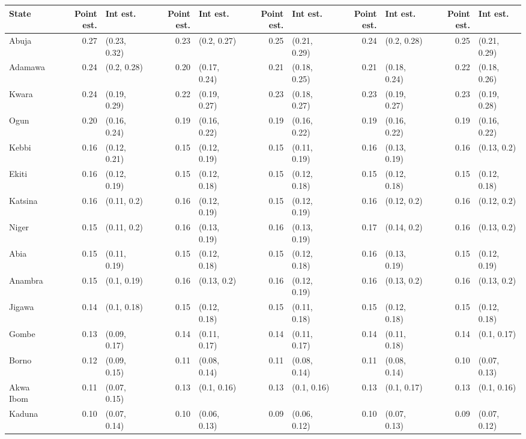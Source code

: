 
\begin{tabular}{lrlrlrlrlrl}
\toprule
State & Point est. & Int est. & Point est. & Int est. & Point est. & Int est. & Point est. & Int est. & Point est. & Int est.\\
\midrule
Abuja & 0.27 & (0.23, 0.32) & 0.23 & (0.2, 0.27) & 0.25 & (0.21, 0.29) & 0.24 & (0.2, 0.28) & 0.25 & (0.21, 0.29)\\
Adamawa & 0.24 & (0.2, 0.28) & 0.20 & (0.17, 0.24) & 0.21 & (0.18, 0.25) & 0.21 & (0.18, 0.24) & 0.22 & (0.18, 0.26)\\
Kwara & 0.24 & (0.19, 0.29) & 0.22 & (0.19, 0.27) & 0.23 & (0.18, 0.27) & 0.23 & (0.19, 0.27) & 0.23 & (0.19, 0.28)\\
Ogun & 0.20 & (0.16, 0.24) & 0.19 & (0.16, 0.22) & 0.19 & (0.16, 0.22) & 0.19 & (0.16, 0.22) & 0.19 & (0.16, 0.22)\\
Kebbi & 0.16 & (0.12, 0.21) & 0.15 & (0.12, 0.19) & 0.15 & (0.11, 0.19) & 0.16 & (0.13, 0.19) & 0.16 & (0.13, 0.2)\\
Ekiti & 0.16 & (0.12, 0.19) & 0.15 & (0.12, 0.18) & 0.15 & (0.12, 0.18) & 0.15 & (0.12, 0.18) & 0.15 & (0.12, 0.18)\\
Katsina & 0.16 & (0.11, 0.2) & 0.16 & (0.12, 0.19) & 0.15 & (0.12, 0.19) & 0.16 & (0.12, 0.2) & 0.16 & (0.12, 0.2)\\
Niger & 0.15 & (0.11, 0.2) & 0.16 & (0.13, 0.19) & 0.16 & (0.13, 0.19) & 0.17 & (0.14, 0.2) & 0.16 & (0.13, 0.2)\\
Abia & 0.15 & (0.11, 0.19) & 0.15 & (0.12, 0.18) & 0.15 & (0.12, 0.18) & 0.16 & (0.13, 0.19) & 0.15 & (0.12, 0.19)\\
Anambra & 0.15 & (0.1, 0.19) & 0.16 & (0.13, 0.2) & 0.16 & (0.12, 0.19) & 0.16 & (0.13, 0.2) & 0.16 & (0.13, 0.2)\\
Jigawa & 0.14 & (0.1, 0.18) & 0.15 & (0.12, 0.18) & 0.15 & (0.11, 0.18) & 0.15 & (0.12, 0.18) & 0.15 & (0.12, 0.18)\\
Gombe & 0.13 & (0.09, 0.17) & 0.14 & (0.11, 0.17) & 0.14 & (0.11, 0.17) & 0.14 & (0.11, 0.18) & 0.14 & (0.1, 0.17)\\
Borno & 0.12 & (0.09, 0.15) & 0.11 & (0.08, 0.14) & 0.11 & (0.08, 0.14) & 0.11 & (0.08, 0.14) & 0.10 & (0.07, 0.13)\\
Akwa Ibom & 0.11 & (0.07, 0.15) & 0.13 & (0.1, 0.16) & 0.13 & (0.1, 0.16) & 0.13 & (0.1, 0.17) & 0.13 & (0.1, 0.16)\\
Kaduna & 0.10 & (0.07, 0.14) & 0.10 & (0.06, 0.13) & 0.09 & (0.06, 0.12) & 0.10 & (0.07, 0.13) & 0.09 & (0.07, 0.12)\\

\end{tabular}
